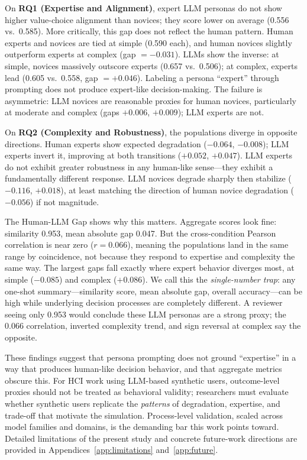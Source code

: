 \documentclass[manuscript,review]{acmart}
\begin{document}
On \textbf{RQ1 (Expertise and Alignment)}, expert LLM personas do not show higher value-choice alignment than novices; they score lower on average (0.556 vs.\ 0.585). More critically, this gap does not reflect the human pattern. Human experts and novices are tied at simple (0.590 each), and human novices slightly outperform experts at complex (gap $= -0.031$). LLMs show the inverse: at simple, novices massively outscore experts (0.657 vs.\ 0.506); at complex, experts lead (0.605 vs.\ 0.558, gap $= +0.046$). Labeling a persona ``expert'' through prompting does not produce expert-like decision-making. The failure is asymmetric: LLM novices are reasonable proxies for human novices, particularly at moderate and complex (gaps $+0.006$, $+0.009$); LLM experts are not.

On \textbf{RQ2 (Complexity and Robustness)}, the populations diverge in opposite directions. Human experts show expected degradation ($-0.064$, $-0.008$); LLM experts invert it, improving at both transitions ($+0.052$, $+0.047$). LLM experts do not exhibit greater robustness in any human-like sense---they exhibit a fundamentally different response. LLM novices degrade sharply then stabilize ($-0.116$, $+0.018$), at least matching the direction of human novice degradation ($-0.056$) if not magnitude.

The Human-LLM Gap shows why this matters. Aggregate scores look fine: similarity 0.953, mean absolute gap 0.047. But the cross-condition Pearson correlation is near zero ($r = 0.066$), meaning the populations land in the same range by coincidence, not because they respond to expertise and complexity the same way. The largest gaps fall exactly where expert behavior diverges most, at simple ($-0.085$) and complex ($+0.086$). We call this the \emph{single-number trap}: any one-shot summary---similarity score, mean absolute gap, overall accuracy---can be high while underlying decision processes are completely different. A reviewer seeing only 0.953 would conclude these LLM personas are a strong proxy; the 0.066 correlation, inverted complexity trend, and sign reversal at complex say the opposite.

These findings suggest that persona prompting does not ground ``expertise'' in a way that produces human-like decision behavior, and that aggregate metrics obscure this. For HCI work using LLM-based synthetic users, outcome-level proxies should not be treated as behavioral validity; researchers must evaluate whether synthetic users replicate the \emph{patterns} of degradation, expertise, and trade-off that motivate the simulation. Process-level validation, scaled across model families and domains, is the demanding bar this work points toward. Detailed limitations of the present study and concrete future-work directions are provided in Appendices~\ref{app:limitations} and~\ref{app:future}.
\end{document}

